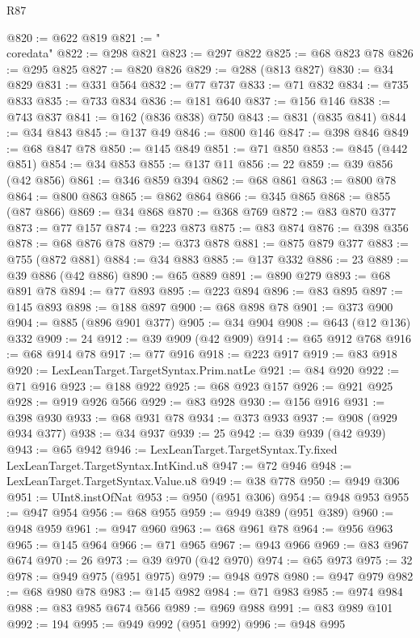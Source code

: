 \begin{lexlean}{R87}
\begin{coremodule}
{{@820 := @622 @819
@821 := "\\coredata"
@822 := @298 @821
@823 := @297 @822
@825 := @68 @823 @78
@826 := @295 @825
@827 := @820 @826
@829 := @288 (@813 @827)
@830 := @34 @829
@831 := @331 @564
@832 := @77 @737
@833 := @71 @832
@834 := @735 @833
@835 := @733 @834
@836 := @181 @640
@837 := @156 @146
@838 := @743 @837
@841 := @162 (@836 @838) @750
@843 := @831 (@835 @841)
@844 := @34 @843
@845 := @137 @49
@846 := @800 @146
@847 := @398 @846
@849 := @68 @847 @78
@850 := @145 @849
@851 := @71 @850
@853 := @845 (@442 @851)
@854 := @34 @853
@855 := @137 @11
@856 := 22
@859 := @39 @856 (@42 @856)
@861 := @346 @859 @394
@862 := @68 @861
@863 := @800 @78
@864 := @800 @863
@865 := @862 @864
@866 := @345 @865
@868 := @855 (@87 @866)
@869 := @34 @868
@870 := @368 @769
@872 := @83 @870 @377
@873 := @77 @157
@874 := @223 @873
@875 := @83 @874
@876 := @398 @356
@878 := @68 @876 @78
@879 := @373 @878
@881 := @875 @879 @377
@883 := @755 (@872 @881)
@884 := @34 @883
@885 := @137 @332
@886 := 23
@889 := @39 @886 (@42 @886)
@890 := @65 @889
@891 := @890 @279
@893 := @68 @891 @78
@894 := @77 @893
@895 := @223 @894
@896 := @83 @895
@897 := @145 @893
@898 := @188 @897
@900 := @68 @898 @78
@901 := @373 @900
@904 := @885 (@896 @901 @377)
@905 := @34 @904
@908 := @643 (@12 @136) @332
@909 := 24
@912 := @39 @909 (@42 @909)
@914 := @65 @912 @768
@916 := @68 @914 @78
@917 := @77 @916
@918 := @223 @917
@919 := @83 @918
@920 := LexLeanTarget.TargetSyntax.Prim.natLe
@921 := @84 @920
@922 := @71 @916
@923 := @188 @922
@925 := @68 @923 @157
@926 := @921 @925
@928 := @919 @926 @566
@929 := @83 @928
@930 := @156 @916
@931 := @398 @930
@933 := @68 @931 @78
@934 := @373 @933
@937 := @908 (@929 @934 @377)
@938 := @34 @937
@939 := 25
@942 := @39 @939 (@42 @939)
@943 := @65 @942
@946 := LexLeanTarget.TargetSyntax.Ty.fixed LexLeanTarget.TargetSyntax.IntKind.u8
@947 := @72 @946
@948 := LexLeanTarget.TargetSyntax.Value.u8
@949 := @38 @778
@950 := @949 @306
@951 := UInt8.instOfNat
@953 := @950 (@951 @306)
@954 := @948 @953
@955 := @947 @954
@956 := @68 @955
@959 := @949 @389 (@951 @389)
@960 := @948 @959
@961 := @947 @960
@963 := @68 @961 @78
@964 := @956 @963
@965 := @145 @964
@966 := @71 @965
@967 := @943 @966
@969 := @83 @967 @674
@970 := 26
@973 := @39 @970 (@42 @970)
@974 := @65 @973
@975 := 32
@978 := @949 @975 (@951 @975)
@979 := @948 @978
@980 := @947 @979
@982 := @68 @980 @78
@983 := @145 @982
@984 := @71 @983
@985 := @974 @984
@988 := @83 @985 @674 @566
@989 := @969 @988
@991 := @83 @989 @101
@992 := 194
@995 := @949 @992 (@951 @992)
@996 := @948 @995
}}
\end{coremodule}
\end{lexlean}

